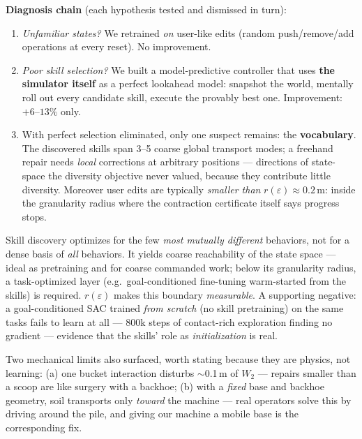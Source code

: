 \documentclass[11pt,a4paper]{article}
\begin{document}
\textbf{Diagnosis chain} (each hypothesis tested and dismissed in turn):
\begin{enumerate}[leftmargin=6mm]
\item \emph{Unfamiliar states?} We retrained \emph{on} user-like edits
(random push/remove/add operations at every reset). No improvement.
\item \emph{Poor skill selection?} We built a model-predictive controller that
uses \textbf{the simulator itself} as a perfect lookahead model: snapshot the
world, mentally roll out every candidate skill, execute the provably best one.
Improvement: $+6$--$13\%$ only.
\item With perfect selection eliminated, only one suspect remains: the
\textbf{vocabulary}. The discovered skills span 3--5 coarse global transport
modes; a freehand repair needs \emph{local} corrections at arbitrary positions
--- directions of state-space the diversity objective never valued, because they
contribute little diversity. Moreover user edits are typically \emph{smaller
than} $r(\varepsilon) \approx 0.2$\,m: inside the granularity radius where the
contraction certificate itself says progress stops.
\end{enumerate}

\begin{keyresult}[title=\textbf{Diversity $\neq$ controllability}]
Skill discovery optimizes for the few \emph{most mutually different} behaviors,
not for a dense basis of \emph{all} behaviors. It yields coarse reachability
of the state space --- ideal as pretraining and for coarse commanded work; below
its granularity radius, a task-optimized layer (e.g.\ goal-conditioned
fine-tuning warm-started from the skills) is required. $r(\varepsilon)$ makes
this boundary \emph{measurable}. A supporting negative: a goal-conditioned SAC
trained \emph{from scratch} (no skill pretraining) on the same tasks fails to
learn at all --- 800k steps of contact-rich exploration finding no gradient ---
evidence that the skills' role as \emph{initialization} is real.
\end{keyresult}

Two mechanical limits also surfaced, worth stating because they are physics, not
learning: (a) one bucket interaction disturbs $\sim$0.1\,m of $W_2$ --- repairs
smaller than a scoop are like surgery with a backhoe; (b) with a \emph{fixed}
base and backhoe geometry, soil transports only \emph{toward} the machine ---
real operators solve this by driving around the pile, and giving our machine a
mobile base is the corresponding fix.
\end{document}
